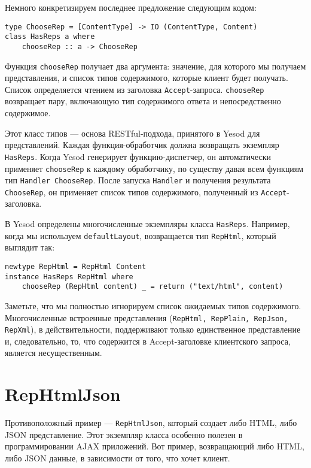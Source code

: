 Немного конкретизируем последнее предложение следующим кодом:

\begin{lstlisting}
type ChooseRep = [ContentType] -> IO (ContentType, Content)
class HasReps a where
    chooseRep :: a -> ChooseRep
\end{lstlisting}

Функция \lstinline'chooseRep' получает два аргумента: значение, для которого мы получаем
представления, и список типов содержимого, которые клиент будет получать. Список
определяется чтением из заголовка \verb*|Accept|-запроса. \lstinline'chooseRep' возвращает
пару,
включающую тип содержимого ответа и непосредственно содержимое.

Этот класс типов --- основа RESTful-подхода, принятого в Yesod для представлений. Каждая
функция-обработчик должна возвращать экземпляр \lstinline'HasReps'. Когда Yesod генерирует
функцию-диспетчер, он автоматически применяет \lstinline'chooseRep' к каждому обработчику,
по существу давая всем функциям тип \lstinline'Handler ChooseRep'. После  запуска
\lstinline'Handler' и получения результата \lstinline'ChooseRep',  он применяет список
типов содержимого, полученный из \verb*|Accept|-заголовка.

В Yesod определены многочисленные экземпляры класса \lstinline'HasReps'. Например, когда
мы используем \lstinline'defaultLayout', возвращается тип \lstinline'RepHtml', который
выглядит так:

\begin{lstlisting}
newtype RepHtml = RepHtml Content
instance HasReps RepHtml where
    chooseRep (RepHtml content) _ = return ("text/html", content)
\end{lstlisting}

Заметьте, что мы полностью игнорируем список ожидаемых типов содержимого. Многочисленные встроенные представления (\lstinline'RepHtml, RepPlain, RepJson, RepXml'), в действительности, поддерживают только единственное представление и, следовательно, то, что содержится в Accept-заголовке клиентского запроса, является несущественным.

\section{RepHtmlJson}

Противоположный пример --- \lstinline'RepHtmlJson', который создает либо HTML, либо JSON
представление. Этот экземпляр класса особенно полезен в программировании AJAX приложений.
Вот пример, возвращающий либо HTML, либо JSON данные, в зависимости от того, что хочет
клиент.


